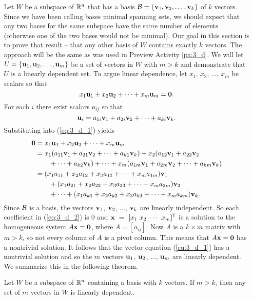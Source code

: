 Let $W$ be a subspace of $\mathbb{R}^n$ that has a basis $\mathcal{B} = \{\mathbf{v}_1, \mathbf{v}_2, \ldots, \mathbf{v}_k\}$ of $k$ vectors. Since we have been calling bases minimal spanning sets, we should expect that any two bases for the same subspace have the same number of elements (otherwise one of the two bases would not be minimal). Our goal in this section is to prove that result -- that any other basis of $W$ contains exactly $k$ vectors. The approach will be the same as was used in Preview Activity \ref{pa:3_d}. We will let $U = \{\mathbf{u}_1, \mathbf{u}_2, \ldots, \mathbf{u}_m\}$ be a set of vectors in $W$ with $m > k$ and demonstrate that $U$ is a linearly dependent set. To argue linear dependence, let $x_1$, $x_2$, $\ldots$, $x_m$ be scalars so that
\begin{equation} \label{eq:3_d_1}
x_1 \mathbf{u}_1 + x_2 \mathbf{u}_2 + \cdots + x_m \mathbf{u}_m = \mathbf{0}.
\end{equation}
For each $i$ there exist scalars $a_{ij}$ so that
\[\mathbf{u}_i = a_{1i}\mathbf{v}_1 + a_{2i}\mathbf{v}_2 + \cdots + a_{ki}\mathbf{v}_k.\]
Substituting into (\ref{eq:3_d_1}) yields
\begin{align}
\mathbf{0} &= x_1 \mathbf{u}_1 + x_2 \mathbf{u}_2 + \cdots + x_m \mathbf{u}_m \notag \\
	&= x_1( a_{11}\mathbf{v}_1 + a_{21}\mathbf{v}_2 + \cdots + a_{k1}\mathbf{v}_k ) + x_2 ( a_{12}\mathbf{v}_1 + a_{22}\mathbf{v}_2 \notag \\
		&\qquad + \cdots  + a_{k2}\mathbf{v}_k ) + \cdots + x_m ( a_{1m}\mathbf{v}_1 + a_{2m}\mathbf{v}_2 + \cdots + a_{km}\mathbf{v}_k ) \notag \\
	&= (x_1a_{11}+x_2a_{12}+x_3a_{13} + \cdots + x_ma_{1m})\mathbf{v}_1 \notag \\
		&\qquad + (x_1a_{21}+x_2a_{22}+x_3a_{23} + \cdots + x_ma_{2m})\mathbf{v}_2 \notag \\
		&\qquad + \cdots  + (x_1a_{k1}+x_2a_{k2}+x_3a_{k3} + \cdots + x_ma_{km})\mathbf{v}_k. \label{eq:3_d_2}
\end{align}
Since $\mathcal{B}$ is a basis, the vectors $\mathbf{v}_1$, $\mathbf{v}_2$, $\ldots$, $\mathbf{v}_k$ are linearly independent. So each coefficient in (\ref{eq:3_d_2}) is 0 and $\mathbf{x}~=~[x_1 \ x_2 \ \cdots \ x_m]^{\mathsf{T}}$ is a solution to the homogeneous system $A \mathbf{x} = \mathbf{0}$, where $A = [a_{ij}]$. Now $A$ is a $k \times m$ matrix with $m > k$, so not every column of $A$ is a pivot column. This means that $A \mathbf{x} = \mathbf{0}$ has a nontrivial solution. It follows that the vector equation (\ref{eq:3_d_1}) has a nontrivial solution and so the $m$ vectors $\mathbf{u}_1$, $\mathbf{u}_2$, $\ldots$, $\mathbf{u}_m$ are linearly dependent. We summarize this in the following theorem. 


\begin{theorem} \label{thm:3_d_1}  Let $W$ be a subspace of $\mathbb{R}^n$ containing a basis with $k$ vectors. If $m > k$, then any set of $m$ vectors in $W$ is linearly dependent.
\end{theorem}



